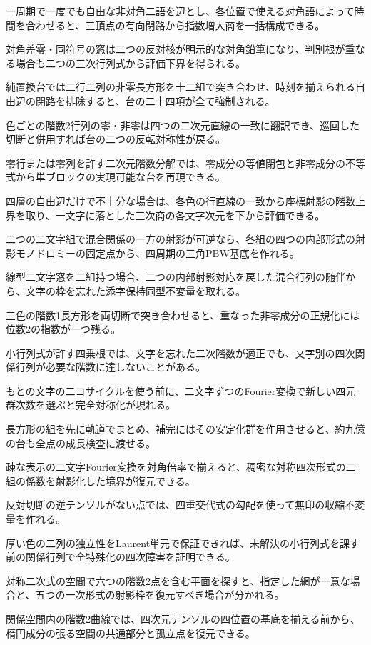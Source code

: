 \documentclass[11pt,a4paper]{ltjsarticle}
\begin{document}
一周期で一度でも自由な非対角二語を辺とし、各位置で使える対角語によって時間を合わせると、三頂点の有向閉路から指数増大商を一括構成できる。

対角差零・同符号の窓は二つの反対核が明示的な対角鉛筆になり、判別根が重なる場合も二つの三次行列式から評価下界を得られる。

純置換台では二行二列の非零長方形を十二組で突き合わせ、時刻を揃えられる自由辺の閉路を排除すると、台の二十四項が全て強制される。

色ごとの階数2行列の零・非零は四つの二次元直線の一致に翻訳でき、巡回した切断と併用すれば台の二つの反転対称性が戻る。

零行または零列を許す二次元階数分解では、零成分の等値閉包と非零成分の不等式から単ブロックの実現可能な台を再現できる。

四層の自由辺だけで不十分な場合は、各色の行直線の一致から座標射影の階数上界を取り、一文字に落とした三次商の各文字次元を下から評価できる。

二つの二文字組で混合関係の一方の射影が可逆なら、各組の四つの内部形式の射影モノドロミーの固定点から、四周期の三角PBW基底を作れる。

線型二文字窓を二組持つ場合、二つの内部射影対応を戻した混合行列の随伴から、文字の枠を忘れた添字保持同型不変量を取れる。

三色の階数1長方形を両切断で突き合わせると、重なった非零成分の正規化には位数2の指数が一つ残る。

小行列式が許す四乗根では、文字を忘れた二次階数が適正でも、文字別の四次関係行列が必要な階数に達しないことがある。

もとの文字の二コサイクルを使う前に、二文字ずつのFourier変換で新しい四元群次数を選ぶと完全対称化が現れる。

長方形の組を先に軌道でまとめ、補完にはその安定化群を作用させると、約九億の台も全点の成長検査に渡せる。

疎な表示の二文字Fourier変換を対角倍率で揃えると、稠密な対称四次形式の二組の係数を射影化した境界が復元できる。

反対切断の逆テンソルがない点では、四重交代式の勾配を使って無印の収縮不変量を作れる。

厚い色の二列の独立性をLaurent単元で保証できれば、未解決の小行列式を課す前の関係行列で全特殊化の四次障害を証明できる。

対称二次式の空間で六つの階数2点を含む平面を探すと、指定した網が一意な場合と、五つの一次形式の射影枠を復元すべき場合が分かれる。

関係空間内の階数2曲線では、四次元テンソルの四位置の基底を揃える前から、楕円成分の張る空間の共通部分と孤立点を復元できる。
\end{document}
